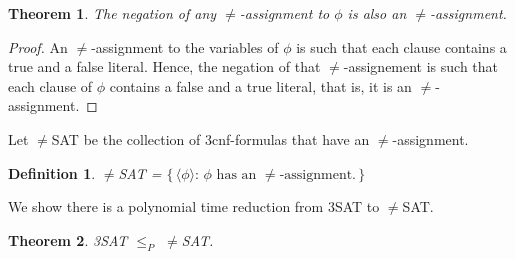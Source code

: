 \documentclass{article}
\newcommand{\theoremname}{Theorem}
\newcommand{\definitionname}{Definition}
\newtheorem{theorem}{\theoremname}
\newtheorem{definition}{\definitionname}
\newcommand{\st}{\colon\,}
\begin{document}
\begin{theorem}\label{neg}
  The negation of any $\ne$-assignment to $\phi$ is also an $\ne$-assignment.
\end{theorem}
\begin{proof}
  An $\ne$-assignment to the variables of $\phi$ is such that each clause
  contains a true and a false literal. Hence, the negation of that
  $\ne$-assignement is such that each clause of $\phi$ contains a false
  and a true literal, that is, it is an $\ne$-assignment.
\end{proof}

Let $\ne$SAT be the collection of 3cnf-formulas that have an $\ne$-assignment.
\begin{definition}
  $\ne$SAT = $\{\,\langle \phi \rangle\st \text{$\phi$ has an $\ne$-assignment.} \,\}$
\end{definition}

We show there is a polynomial time reduction from 3SAT to $\ne$SAT.
\begin{theorem}
  3SAT $\le_P$ $\ne$SAT.
\end{theorem}
\end{document}
